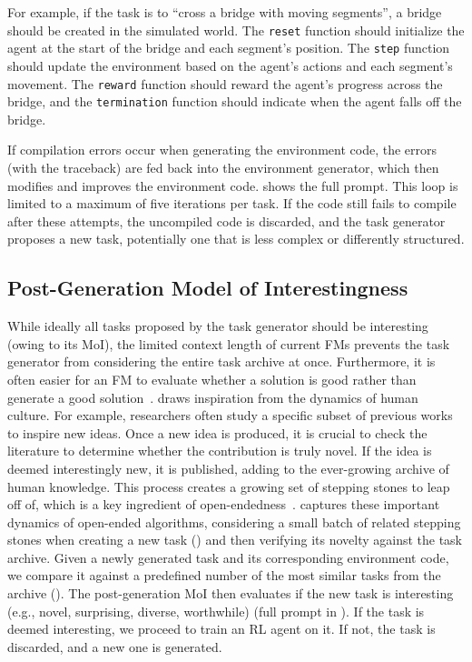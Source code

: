 \documentclass{article} %
\begin{document}
For example, if the task is to ``cross a bridge with moving segments'', a bridge should be created in the simulated world. The \texttt{reset} function should initialize the agent at the start of the bridge and each segment's position. The \texttt{step} function should update the environment based on the agent's actions and each segment's movement. The \texttt{reward} function should reward the agent's progress across the bridge, and the \texttt{termination} function should indicate when the agent falls off the bridge.

If compilation errors occur when generating the environment code, the errors (with the traceback) are fed back into the environment generator, which then modifies and improves the environment code.  shows the full prompt. This loop is limited to a maximum of five iterations per task. If the code still fails to compile after these attempts, the uncompiled code is discarded, and the task generator proposes a new task, potentially one that is less complex or differently structured.

\vspace{-5pt}
\subsection{Post-Generation Model of Interestingness}
\label{subsec:model-of-interestingness}
\vspace{-4pt}

While ideally all tasks proposed by the task generator should be interesting (owing to its MoI), the limited context length of current FMs prevents the task generator from considering the entire task archive at once. Furthermore, it is often easier for an FM to evaluate whether a solution is good rather than generate a good solution~\citep{bradley2023quality}.
\ours{} draws inspiration from the dynamics of human culture. For example, researchers often study a specific subset of previous works to inspire new ideas. Once a new idea is produced, it is crucial to check the literature to determine whether the contribution is truly novel. If the idea is deemed interestingly new, it is published, adding to the ever-growing archive of human knowledge. This process creates a growing set of stepping stones to leap off of, which is a key ingredient of open-endedness~\citep{stanley2015greatness}. \ours{} captures these important dynamics of open-ended algorithms, considering a small batch of related stepping stones when creating a new task () and then verifying its novelty against the task archive.
Given a newly generated task and its corresponding environment code, we compare it against a predefined number of the most similar tasks from the archive (). The post-generation MoI then evaluates if the new task is interesting (e.g., novel, surprising, diverse, worthwhile) (full prompt in ). If the task is deemed interesting, we proceed to train an RL agent on it. If not, the task is discarded, and a new one is generated.
\end{document}
